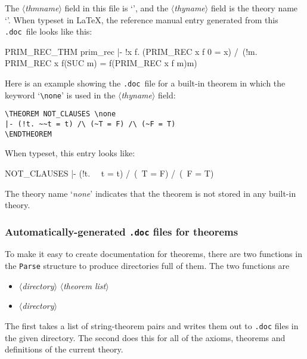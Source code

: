 \documentclass[12pt]{article}
\def\doc{{\tt .doc}}
\def\latex{{\LaTeX}}
\def\sp{\hspace*{3.5mm}}
\def\meta#1{\(\langle\){\it #1}\(\rangle\)}
\begin{document}
\smallskip

\noindent The \meta{thmname} field in this file is  `',
and the \meta{thyname} field is the theory name `'. When
typeset in \latex, the reference manual entry generated from this \doc\ file
looks like this:

{\def\filbreak{\relax}
\THEOREM PRIM\_REC\_THM prim\_rec
|- !x f.
    (PRIM_REC x f 0 = x) /\
    (!m. PRIM_REC x f(SUC m) = f(PRIM_REC x f m)m)
\ENDTHEOREM
}\vspace{4mm plus2mm minus1mm}


Here is an example showing the \doc\ file for a built-in theorem in which  the
keyword `{\small\verb!\none!}' is used in the \meta{thyname} field:

\smallskip

\begin{holboxed}\begin{verbatim}
\THEOREM NOT_CLAUSES \none
|- (!t. ~~t = t) /\ (~T = F) /\ (~F = T)
\ENDTHEOREM
\end{verbatim}\end{holboxed}

\smallskip

\noindent When typeset, this entry looks like:

{\def\filbreak{\relax}
\THEOREM NOT\_CLAUSES {\none}
|- (!t. ~~t = t) /\ (~T = F) /\ (~F = T)
\ENDTHEOREM
}\vspace{4mm plus2mm minus1mm}

\noindent  The theory name `{\it none}' indicates that the theorem is not
stored in any built-in theory.

\subsubsection{Automatically-generated {\tt .doc} files for theorems}

To make it easy to create documentation for theorems, there are two
functions in the \texttt{Parse} structure to produce directories full
of them.  The two functions are

\begin{itemize}
\item {}\sp\meta{directory}\sp
  \meta{theorem list}

\item {}\sp\meta{directory}
\end{itemize}

\noindent The first takes a list of string-theorem pairs and writes
them out to \texttt{.doc} files in the given directory.  The second
does this for all of the axioms, theorems and definitions of the
current theory.
\end{document}
